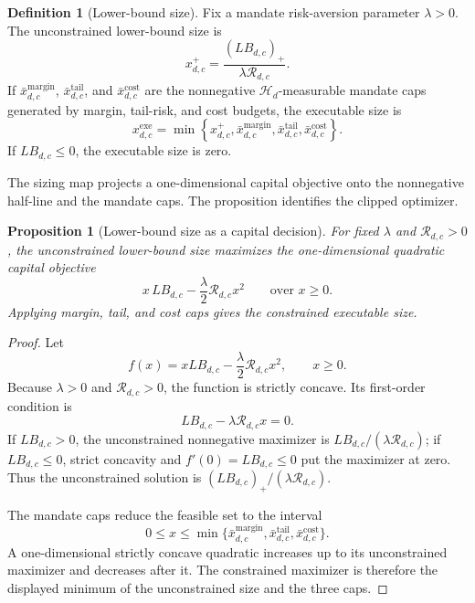 \documentclass[11pt,a4paper]{amsart}
\theoremstyle{plain}
\newtheorem{proposition}[theorem]{Proposition}
\theoremstyle{definition}
\newtheorem{definition}[theorem]{Definition}
\theoremstyle{remark}
\newcommand{\cH}{\mathcal{H}}
\begin{document}
\begin{definition}[Lower-bound size]\label{def:lower-bound-size}
Fix a mandate risk-aversion parameter \(\lambda>0\).  The unconstrained lower-bound size is
\[
        x^+_{d,c}
        =
        \frac{(LB_{d,c})_+}{\lambda\mathcal R_{d,c}}.
\]
If \(\bar x^{\mathrm{margin}}_{d,c}\), \(\bar x^{\mathrm{tail}}_{d,c}\), and
\(\bar x^{\mathrm{cost}}_{d,c}\) are the nonnegative \(\cH_d\)-measurable mandate caps generated by
margin, tail-risk, and cost budgets, the executable size is
\[
        x^{\mathrm{exe}}_{d,c}
        =
        \min\left\{
        x^+_{d,c},
        \bar x^{\mathrm{margin}}_{d,c},
        \bar x^{\mathrm{tail}}_{d,c},
        \bar x^{\mathrm{cost}}_{d,c}
        \right\}.
\]
If \(LB_{d,c}\le0\), the executable size is zero.
\end{definition}

The sizing map projects a one-dimensional capital objective onto the nonnegative half-line and the
mandate caps.  The proposition identifies the clipped optimizer.

\begin{proposition}[Lower-bound size as a capital decision]\label{prop:lower-bound-sizing}
For fixed \(\lambda\) and \(\mathcal R_{d,c}>0\), the unconstrained lower-bound size maximizes the
one-dimensional quadratic capital objective
\[
        x\,LB_{d,c}-\frac{\lambda}{2}\mathcal R_{d,c}x^2
        \qquad\text{over }x\ge0.
\]
Applying margin, tail, and cost caps gives the constrained executable size.
\end{proposition}

\begin{proof}
Let
\[
        f(x)=xLB_{d,c}-\frac{\lambda}{2}\mathcal R_{d,c}x^2,
        \qquad x\ge0.
\]
Because \(\lambda>0\) and \(\mathcal R_{d,c}>0\), the function is strictly concave.  Its
first-order condition is
\[
        LB_{d,c}-\lambda\mathcal R_{d,c}x=0.
\]
If \(LB_{d,c}>0\), the unconstrained nonnegative maximizer is
\(LB_{d,c}/(\lambda\mathcal R_{d,c})\); if \(LB_{d,c}\le0\), strict concavity and
\(f'(0)=LB_{d,c}\le0\) put the maximizer at zero.  Thus the unconstrained solution is
\((LB_{d,c})_+/(\lambda\mathcal R_{d,c})\).

The mandate caps reduce the feasible set to the interval
\[
        0\le x\le
        \min\{\bar x^{\mathrm{margin}}_{d,c},
        \bar x^{\mathrm{tail}}_{d,c},
        \bar x^{\mathrm{cost}}_{d,c}\}.
\]
A one-dimensional strictly concave quadratic increases up to its unconstrained maximizer and
decreases after it.  The constrained maximizer is therefore the displayed minimum of the
unconstrained size and the three caps.
\end{proof}
\end{document}
